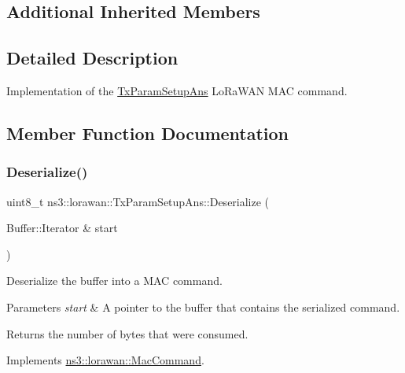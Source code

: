 \subsection*{Additional Inherited Members}


\subsection{Detailed Description}
Implementation of the \hyperlink{classns3_1_1lorawan_1_1TxParamSetupAns}{Tx\+Param\+Setup\+Ans} Lo\+Ra\+W\+AN M\+AC command. 

\subsection{Member Function Documentation}
\mbox{\label{classns3_1_1lorawan_1_1TxParamSetupAns_a74b739bce4a3443d9e9cba1cf397d43f}} 
\subsubsection{\texorpdfstring{Deserialize()}{Deserialize()}}
{\footnotesize\ttfamily uint8\+\_\+t ns3\+::lorawan\+::\+Tx\+Param\+Setup\+Ans\+::\+Deserialize (\begin{DoxyParamCaption}\item[{Buffer\+::\+Iterator \&}]{start }\end{DoxyParamCaption})\hspace{0.3cm}{\ttfamily [virtual]}}

Deserialize the buffer into a M\+AC command.


\begin{DoxyParams}{Parameters}
{\em start} & A pointer to the buffer that contains the serialized command. \\
\hline
\end{DoxyParams}
\begin{DoxyReturn}{Returns}
the number of bytes that were consumed. 
\end{DoxyReturn}


Implements \hyperlink{classns3_1_1lorawan_1_1MacCommand_af12d223a71a67196bce498f1240eda75}{ns3\+::lorawan\+::\+Mac\+Command}.

\mbox{\label{classns3_1_1lorawan_1_1TxParamSetupAns_ac25e03a1ce6ce0d52ba94f56bac8c208}} 
